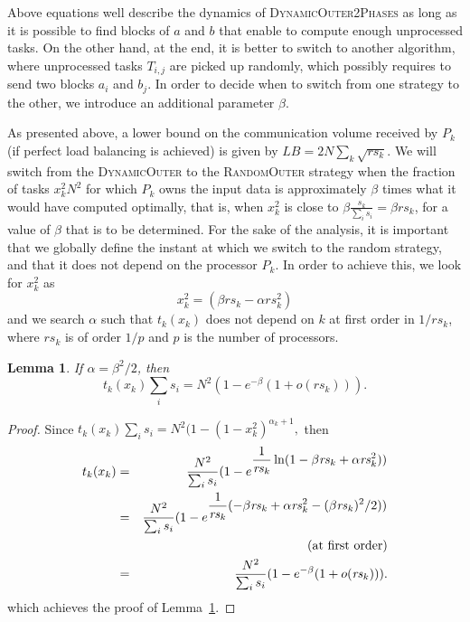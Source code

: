 \documentclass[a4paper,10pt]{article}
\newtheorem{lemma}[theorem]{Lemma}
\newcommand{\simplerandom}{\textsc{Random\-Outer}\xspace}
\newcommand{\stupid}{\textsc{Dynamic\-Outer}\xspace}
\newcommand{\stupidthreshold}{\textsc{Dynamic\-Outer\-2Phases}\xspace}
\begin{document}
Above equations well describe the dynamics of \stupidthreshold as long
as it is possible to find blocks of $a$ and $b$ that enable to compute
enough unprocessed tasks. On the other hand, at the end, it is better
to switch to another algorithm, where unprocessed tasks
$T_{i,j}$ are picked up randomly, which possibly requires to send two
blocks $a_i$ and $b_j$. In order to decide when to switch from one
strategy to the other, we introduce an additional parameter $\beta$.


As presented above, a lower bound on the communication volume received
by $P_k$ (if perfect load balancing is achieved) is given by $LB=2 N
\sum_k\sqrt{\mathit{rs}_k}$.  We will switch from the \stupid to
the \simplerandom strategy when the fraction of tasks $x_k^2 N^2$ for
which $P_k$ owns the input data is approximately $\beta$ times what it
would have computed optimally, that is, when $x_k^2$ is close to
$\beta \frac{s_k}{\sum_i s_i} = \beta \mathit{rs}_k$, for a value of
$\beta$ that is to be determined. For the sake of the analysis, it is
important that we globally define the instant at which we switch to
the random strategy, and that it does not depend on the processor
$P_k$. In order to achieve this, we look for $x_k^2$ as $$x_k^2=
(\beta \mathit{rs}_k -\alpha \mathit{rs}_k^2)$$ and we search $\alpha$
such that $t_k(x_k)$ does not depend on $k$ at first order in
$1/\mathit{rs}_k$, where $\mathit{rs}_k$ is of order $1/p$ and $p$
is the number of processors.


\begin{lemma}
\label{lembeta}
If $\alpha=\beta^2/2$, then $$t_k(x_k) \sum_i s_i = N^2 (1 -e^{-\beta} (1+o(\mathit{rs}_k))).$$
\end{lemma}

\begin{proof}
  Since $t_k(x_k) \sum_i s_i =N^2 (1- (1-x_k^2)^{\alpha_k+1},$ then
  \begin{eqnarray*}
    t_k(x_k) &=& \frac{N^2}{\sum_i s_i} ( 1 - e^{\displaystyle \frac{1}{\mathit{rs}_k} \ln (1-\beta \mathit{rs}_k + \alpha \mathit{rs}_k^2))}\\
    & = & \frac{N^2}{\sum_i s_i} ( 1 - e^{\displaystyle
      \frac{1}{\mathit{rs}_k} (-\beta \mathit{rs}_k + \alpha
      \mathit{rs}_k^2- (\beta \mathit{rs}_k)^2/2 ))} \\
    &&\hspace{4cm} \textnormal{ (at first order)}\\
 & = & \frac{N^2}{\sum_i s_i} ( 1 - e^{-\beta}(1+o(\mathit{rs}_k))).
  \end{eqnarray*}
  which achieves the proof of Lemma~\ref{lembeta}.
\end{proof}
\end{document}
